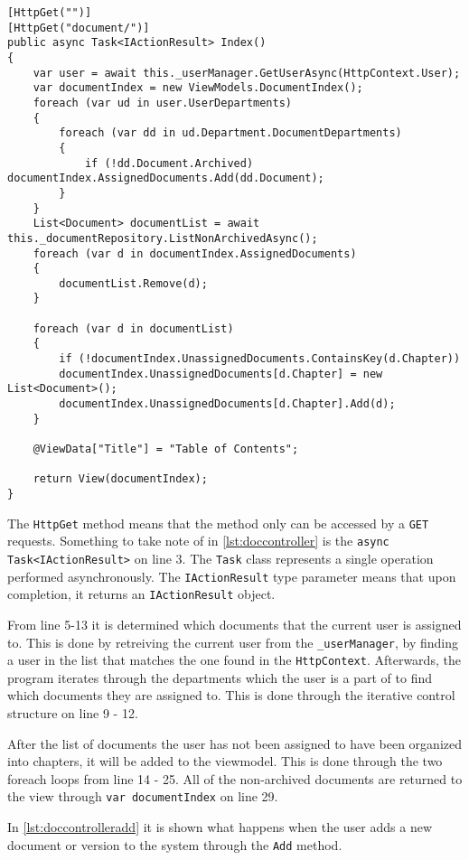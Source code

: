 \begin{lstlisting}[caption={Document Controller: Index}, label={lst:doccontroller}]
[HttpGet("")]
[HttpGet("document/")]
public async Task<IActionResult> Index()
{
	var user = await this._userManager.GetUserAsync(HttpContext.User);
	var documentIndex = new ViewModels.DocumentIndex();
	foreach (var ud in user.UserDepartments)
	{
		foreach (var dd in ud.Department.DocumentDepartments)
		{
			if (!dd.Document.Archived) documentIndex.AssignedDocuments.Add(dd.Document);
		}
	}
	List<Document> documentList = await this._documentRepository.ListNonArchivedAsync();
	foreach (var d in documentIndex.AssignedDocuments)
	{
		documentList.Remove(d);
	}

	foreach (var d in documentList)
	{
		if (!documentIndex.UnassignedDocuments.ContainsKey(d.Chapter))
		documentIndex.UnassignedDocuments[d.Chapter] = new List<Document>();
		documentIndex.UnassignedDocuments[d.Chapter].Add(d);
	}

	@ViewData["Title"] = "Table of Contents";

	return View(documentIndex);
}
\end{lstlisting}

The \texttt{HttpGet} method means that the method only can be accessed by a \texttt{GET} requests.
Something to take note of in \cref{lst:doccontroller} is the \texttt{async Task<IActionResult>} on line 3.
The \texttt{Task} class represents a single operation \cite{microsoft} performed asynchronously.
The \texttt{IActionResult} type parameter means that upon completion, it returns an \texttt{IActionResult} object.

From line 5-13 it is determined which documents that the current user is assigned to.
This is done by retreiving the current user from the \texttt{_userManager}, by finding a user in the list that matches the one found in the \texttt{HttpContext}.
Afterwards, the program iterates through the departments which the user is a part of to find which documents they are assigned to.
This is done through the iterative control structure on line 9 - 12.

After the list of documents the user has not been assigned to have been organized into chapters, it will be added to the viewmodel.
This is done through the two foreach loops from line 14 - 25.
All of the non-archived documents are returned to the view through \texttt{var documentIndex} on line 29.

In \cref{lst:doccontrolleradd} it is shown what happens when the user adds a new document or version to the system through the \texttt{Add} method.
\\


